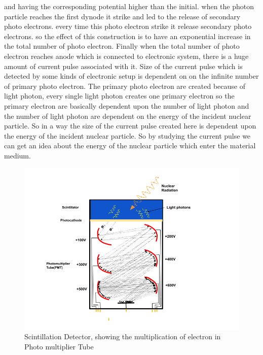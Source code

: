 \documentclass{article}
\begin{document}
\begin{multicols}{2}
and having the corresponding potential higher than the initial. when the photon particle reaches the first dynode it strike and led to the release of secondary photo electrons. every time this photo electron strike it release secondary photo electrons. so the effect of this construction is to have an exponential increase in the total number of photo electron. Finally when the total number of photo electron reaches anode which is connected to electronic system, there is a huge amount of current pulse associated with it. Size of the current pulse which is detected by some kinds of electronic setup is dependent on on the infinite number of primary photo electron. The primary photo electron  are created because of light photon, every single light photon creates one primary electron so the primary electron are basically dependent upon the number of light photon and the number of light photon are dependent on the energy of the incident nuclear particle\cite{eland2013photoelectron}. So in a way the size of the current pulse created here is dependent upon the energy of the incident nuclear particle. So by studying the current pulse we can get an idea about the energy of the nuclear particle which enter the material medium.
\end{multicols}
\begin{figure}[H]
    \centering
    \includegraphics[width=15cm]{images/Fig2_Scintillator_detector.png}
    \caption{Scintillation Detector, showing the multiplication of electron in Photo multiplier Tube}
    \label{fig:2}
\end{figure}
\end{document}
